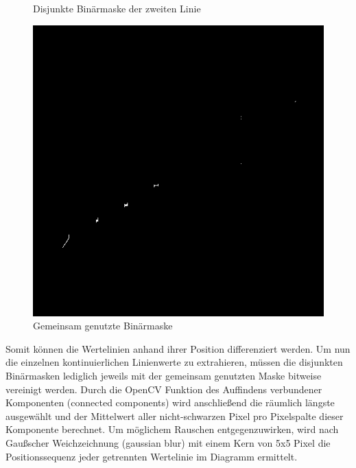 \begin{figure}[H]
\begin{minipage}{0.315\textwidth}
        \caption{ Disjunkte Binärmaske der zweiten Linie}
        \label{fig:alg_layer2}
    \end{minipage}\hfill %
    \begin{minipage}{0.315\textwidth} %
        \centering
        \includegraphics[width=\linewidth]{Implementation/img/alg_shared.png}
        \caption{ Gemeinsam genutzte Binärmaske}
        \label{fig:alg_shared}
    \end{minipage}
\end{figure}

Somit können die Wertelinien anhand ihrer Position differenziert werden. Um nun die einzelnen kontinuierlichen Linienwerte zu extrahieren, müssen die disjunkten Binärmasken lediglich jeweils mit der gemeinsam genutzten Maske bitweise vereinigt werden. Durch die OpenCV Funktion des Auffindens verbundener Komponenten (connected components) wird anschließend die räumlich längste ausgewählt und der Mittelwert aller nicht-schwarzen Pixel pro Pixelspalte dieser Komponente berechnet. Um möglichem Rauschen entgegenzuwirken, wird nach Gaußscher Weichzeichnung (gaussian blur) mit einem Kern von 5x5 Pixel die Positionssequenz jeder getrennten Wertelinie im Diagramm ermittelt.

